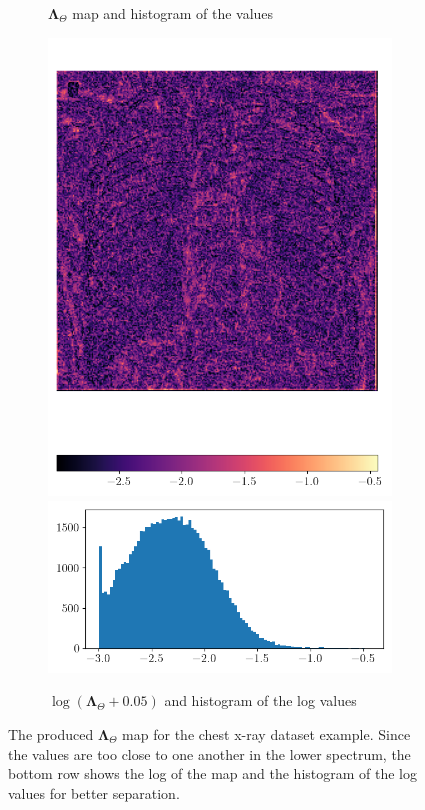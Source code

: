 \documentclass[12pt]{article}
\begin{document}
\begin{figure}[H]
\begin{subfigure}{0.48\textwidth}
  \caption{$\mathbf{\Lambda}_{\Theta}$ map and histogram of the values}
  \end{subfigure}
  \begin{subfigure}{0.48\textwidth}
  \includegraphics[width=1\linewidth]{images//chest_xray/ex_2/lambda_map_log.png}
  \includegraphics[width=1\linewidth]{images//chest_xray/ex_2/lambda_map_values_histogram_log.png}
  \caption{$\log{(\mathbf{\Lambda}_{\Theta} + 0.05)}$ and histogram of the log values}
  \end{subfigure}
  \caption{The produced $\mathbf{\Lambda}_{\Theta}$ map for the chest x-ray dataset example. Since the values are too close to one another in the lower spectrum, the bottom row shows the log of the map and the histogram of the log values for better separation.}
  \label{fig:lambda_map}
\end{figure}
\end{document}

